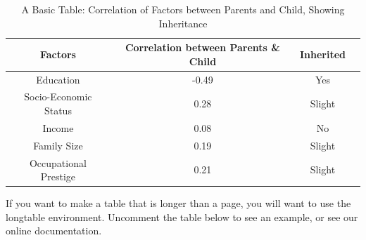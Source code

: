 \documentclass[12pt,twoside]{reedthesis}
\begin{document}
\begin{table}[htdp] %
\caption[Basic Table 1]{A Basic Table: Correlation of Factors between Parents and Child, Showing Inheritance} 
\begin{center} 
\begin{tabular}{c c c c} 
\toprule %
  Factors &  Correlation between Parents \& Child & Inherited \\ %
  \midrule %
Education & -0.49 & Yes \\ %
Socio-Economic Status & 0.28 & Slight \\
Income & 0.08 & No\\
Family Size & 0.19 & Slight \\
Occupational Prestige &0.21 & Slight \\
\bottomrule %
\end{tabular}
\end{center}
\label{inheritance} %
\end{table}

	\clearpage 

If you want to make a table that is longer than a page, you will want to use the longtable environment. Uncomment the table below to see an example, or see our online documentation.
\end{document}
